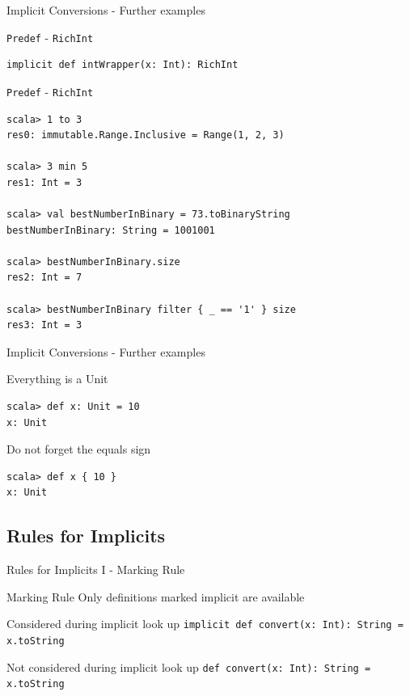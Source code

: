 \begin{frame}[fragile]{Implicit Conversions - Further examples}
\begin{exampleblock}{\lstinline!Predef! - \lstinline!RichInt!}
\begin{lstlisting}
implicit def intWrapper(x: Int): RichInt 
\end{lstlisting}
\end{exampleblock}

\begin{exampleblock}{\lstinline!Predef! - \lstinline!RichInt!}
\begin{lstlisting}
scala> 1 to 3
res0: immutable.Range.Inclusive = Range(1, 2, 3)

scala> 3 min 5
res1: Int = 3

scala> val bestNumberInBinary = 73.toBinaryString
bestNumberInBinary: String = 1001001

scala> bestNumberInBinary.size
res2: Int = 7

scala> bestNumberInBinary filter { _ == '1' } size
res3: Int = 3
\end{lstlisting}
\end{exampleblock}
\end{frame}

\begin{frame}[fragile]{Implicit Conversions - Further examples}
\begin{alertblock}{Everything is a Unit}
\begin{lstlisting}
scala> def x: Unit = 10
x: Unit
\end{lstlisting}
\end{alertblock}
\begin{alertblock}{Do not forget the equals sign}
\begin{lstlisting}
scala> def x { 10 }
x: Unit
\end{lstlisting}
\end{alertblock}
\end{frame}

\subsection{Rules for Implicits}
\begin{frame}[fragile]{Rules for Implicits I - Marking Rule}
\begin{block}{Marking Rule}
Only definitions marked implicit are available
\end{block}
\begin{exampleblock}{Considered during implicit look up}
\lstinline!implicit def convert(x: Int): String = x.toString!
\end{exampleblock}
\begin{alertblock}{Not considered during implicit look up}
\lstinline!def convert(x: Int): String = x.toString!
\end{alertblock}

\end{frame}


